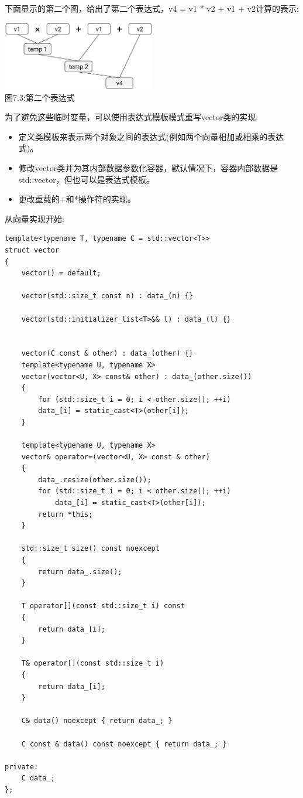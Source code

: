 下面显示的第二个图，给出了第二个表达式，v4 = v1 * v2 + v1 + v2计算的表示:

\begin{center}
\includegraphics[width=0.5\textwidth]{content/3/chapter7/images/3.png}\\
图7.3:第二个表达式
\end{center}

为了避免这些临时变量，可以使用表达式模板模式重写vector类的实现:

\begin{itemize}
\item
定义类模板来表示两个对象之间的表达式(例如两个向量相加或相乘的表达式)。

\item
修改vector类并为其内部数据参数化容器，默认情况下，容器内部数据是std::vector，但也可以是表达式模板。

\item
更改重载的+和*操作符的实现。
\end{itemize}

从向量实现开始:

\begin{lstlisting}[style=styleCXX]
template<typename T, typename C = std::vector<T>>
struct vector
{
	vector() = default;
	
	vector(std::size_t const n) : data_(n) {}
	
	vector(std::initializer_list<T>&& l) : data_(l) {}
	
	
	vector(C const & other) : data_(other) {}
	template<typename U, typename X>
	vector(vector<U, X> const& other) : data_(other.size())
	{
		for (std::size_t i = 0; i < other.size(); ++i)
		data_[i] = static_cast<T>(other[i]);
	}

	template<typename U, typename X>
	vector& operator=(vector<U, X> const & other)
	{
		data_.resize(other.size());
		for (std::size_t i = 0; i < other.size(); ++i)
			data_[i] = static_cast<T>(other[i]);
		return *this;
	}

	std::size_t size() const noexcept
	{
		return data_.size();
	}
	
	T operator[](const std::size_t i) const
	{
		return data_[i];
	}

	T& operator[](const std::size_t i)
	{
		return data_[i];
	}

	C& data() noexcept { return data_; }
	
	C const & data() const noexcept { return data_; }
	
private:
	C data_;
};
\end{lstlisting}

